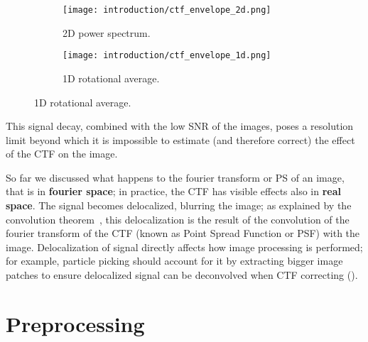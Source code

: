\begin{figure}[ht]
    \centering
    \begin{subfigure}[B]{.42\textwidth}
        \centering
        \texttt{[image: introduction/ctf\_envelope\_2d.png]}
        \caption{2D power spectrum.}
        \label{fig:em_ctf_envelope_2d}
    \end{subfigure}%
    \hfill
    \begin{subfigure}[B]{.55\textwidth}
        \centering
        \texttt{[image: introduction/ctf\_envelope\_1d.png]}
        \caption{1D rotational average.}
        \label{fig:em_ctf_envelope_1d}
    \end{subfigure}%
    \label{fig:em_ctf_envelope}
\end{figure}

This signal decay, combined with the low SNR of the images, poses a resolution limit beyond which it is impossible to estimate (and therefore correct) the effect of the CTF on the image.

So far we discussed what happens to the fourier transform or PS of an image, that is in \textbf{fourier space}; in practice, the CTF has visible effects also in \textbf{real space}.
The signal becomes delocalized, blurring the image; as explained by the convolution theorem~\cite{wikipediaConvolutionTheorem2024}, this delocalization is the result of the convolution of the fourier transform of the CTF (known as Point Spread Function or PSF) with the image.
Delocalization of signal directly affects how image processing is performed; for example, particle picking should account for it by extracting bigger image patches to ensure delocalized signal can be deconvolved when CTF correcting ().

\section{Preprocessing}\label{em_preprocessing}

